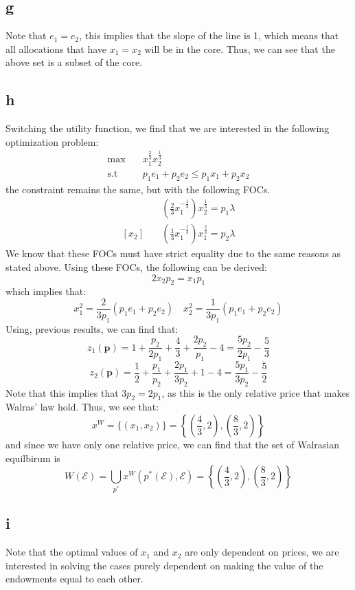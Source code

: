 \documentclass[11pt]{article}
\newcommand{\st}{\text{s.t}}
\begin{document}
\subsection*{g}
Note that $e_1 = e_2$, this implies that the slope of the line is 1, which means that all allocations that have $x_1 = x_2$ will be in the core. Thus, we can see that the above set is a subset of the core. 
\subsection*{h}
Switching the utility function, we find that we are interested in the following optimization problem:
\begin{align*}
    \max & \quad x_1^{\frac{2}{3}}x_2^{\frac{1}{3}}\\
    \st & \quad p_1e_1 + p_2e_2 \leq p_1 x_1 + p_2x_2 
\end{align*}
the constraint remains the same, but with the following FOCs. 
\begin{align*}
    [x_1] & \quad \left( \frac{2}{3} x_1^{-\frac{1}{3}} \right)x_2^\frac{1}{3} = p_1 \lambda\\
    [x_2] & \quad \left( \frac{1}{3}x_1^{-\frac{1}{3}} \right)x_1^\frac{2}{3} = p_2 \lambda
\end{align*}
We know that these FOCs must have strict equality due to the same reasons as stated above. Using these FOCs, the following can be derived:
\[
2x_2p_2 = x_1p_1
\]
which implies that:
\[
x_1^2 = \frac{2}{3p_1} (p_1e_1 + p_2e_2) \quad x_2^2 = \frac{1}{3p_1}(p_1e_1 + p_2e_2)
\]
Using, previous results, we can find that:
\[
z_1(\mathbf{p}) = 1 + \frac{p_2}{2p_1} + \frac{4}{3} + \frac{2p_2}{p_1} - 4 = \frac{5p_2}{2p_1} - \frac{5}{3}
\]
\[
z_2(\mathbf{p}) = \frac{1}{2} + \frac{p_1}{p_2} + \frac{2p_1}{3p_2} + 1 -4 = \frac{5p_1}{3p_2} - \frac{5}{2}
\]
Note that this implies that $3p_2 = 2 p_1$, as this is the only relative price that makes Walras' law hold. Thus, we see that:
\[
x^W = \{(x_1, x_2)\} = \left\{ \left( \frac{4}{3}, 2 \right), \left( \frac{8}{3}, 2 \right)\right\}
\]
and since we have only one relative price, we can find that the set of Walrasian equilbirum is 
\[
    W(\mathcal{E}) = \bigcup_{p^*} x^W(p^*(\mathcal{E}), \mathcal{E})  =  \left\{ \left( \frac{4}{3}, 2 \right), \left( \frac{8}{3}, 2 \right)\right\}
\]
\subsection*{i}
Note that the optimal values of $x_1$ and $x_2$ are only dependent on prices, we are interested in solving the cases purely dependent on making the value of the endowments equal to each other. 
\end{document}
